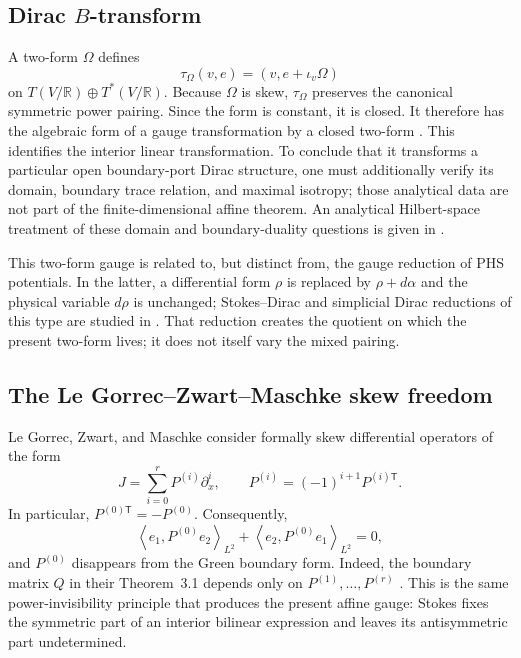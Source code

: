\documentclass[11pt,a4paper]{article}
\theoremstyle{definition}
\theoremstyle{remark}
\newcommand{\R}{\mathbb{R}}
\newcommand{\pair}[2]{\left\langle #1,#2\right\rangle}
\begin{document}
\subsection{Dirac \texorpdfstring{$B$}{B}-transform}

A two-form $\Omega$ defines
\[
 \tau_\Omega(v,e)=(v,e+\iota_v\Omega)
\]
on $T(V/\R)\oplus T^*(V/\R)$.  Because $\Omega$ is skew, $\tau_\Omega$ preserves the
canonical symmetric power pairing.  Since the form is constant, it is closed.  It therefore
has the algebraic form of a gauge transformation by a closed two-form
\cite{bursztynradko2003}.  This identifies the interior linear transformation.  To conclude
that it transforms a particular open boundary-port Dirac structure, one must additionally
verify its domain, boundary trace relation, and maximal isotropy; those analytical data are
not part of the finite-dimensional affine theorem.  An analytical Hilbert-space treatment of
these domain and boundary-duality questions is given in \cite{brugnoli2023}.

This two-form gauge is related to, but distinct from, the gauge reduction of PHS potentials.
In the latter, a differential form $\rho$ is replaced by $\rho+d\alpha$ and the physical
variable $d\rho$ is unchanged; Stokes--Dirac and simplicial Dirac reductions of this type are
studied in \cite{seslija2012}.  That reduction creates the quotient on which the present
two-form lives; it does not itself vary the mixed pairing.

\subsection{The Le Gorrec--Zwart--Maschke skew freedom}

Le Gorrec, Zwart, and Maschke consider formally skew differential operators of the form
\begin{equation}\label{eq:lgzmoperator}
 J=\sum_{i=0}^{r}P^{(i)}\partial_x^i,
 \qquad
 P^{(i)}=(-1)^{i+1}P^{(i)\mathsf T}.
\end{equation}
In particular, $P^{(0)\mathsf T}=-P^{(0)}$.  Consequently,
\begin{equation}\label{eq:p0cancel}
 \pair{e_1}{P^{(0)}e_2}_{L^2}
 +\pair{e_2}{P^{(0)}e_1}_{L^2}=0,
\end{equation}
and $P^{(0)}$ disappears from the Green boundary form.  Indeed, the boundary matrix $Q$ in
their Theorem~3.1 depends only on $P^{(1)},\ldots,P^{(r)}$
\cite{legorrec2005}.  This is the same power-invisibility principle that produces the present
affine gauge: Stokes fixes the symmetric part of an interior bilinear expression and leaves
its antisymmetric part undetermined.
\end{document}
